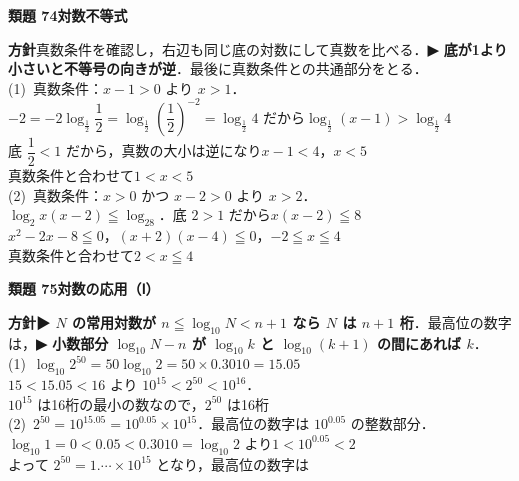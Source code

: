 \documentclass[a4paper,11pt]{ltjsarticle}
\newcommand{\ans}[2]{\Needspace{5\baselineskip}\vspace{6pt}%
  {\sffamily\bfseries 類題 #1\quad #2}\par}
\newcommand{\point}[1]{\textsf{\bfseries ▶ #1}}
\begin{document}
\ans{74}{対数不等式}
\begin{kai}
\textbf{方針}\quad 真数条件を確認し，右辺も同じ底の対数にして真数を比べる．\point{底が1より小さいと不等号の向きが逆}．最後に真数条件との共通部分をとる．\\[2pt]
(1)\ 真数条件：$x-1>0$ より $x>1$．\\
\hspace*{1.5em}$-2=-2\log_{\frac12}\dfrac12=\log_{\frac12}\left(\dfrac12\right)^{-2}=\log_{\frac12}4$ だから\quad $\log_{\frac12}(x-1)>\log_{\frac12}4$\\
\hspace*{1.5em}底 $\dfrac12<1$ だから，真数の大小は逆になり\quad $x-1<4$，\quad $x<5$\\
\hspace*{1.5em}真数条件と合わせて\quad $1<x<5$\\[2pt]
(2)\ 真数条件：$x>0$ かつ $x-2>0$ より $x>2$．\\
\hspace*{1.5em}$\log_2x(x-2)\leqq\log_28$．底 $2>1$ だから\quad $x(x-2)\leqq8$\\
\hspace*{1.5em}$x^2-2x-8\leqq0$，\quad $(x+2)(x-4)\leqq0$，\quad $-2\leqq x\leqq4$\\
\hspace*{1.5em}真数条件と合わせて\quad $2<x\leqq4$
\end{kai}

\ans{75}{対数の応用（Ⅰ）}
\begin{kai}
\textbf{方針}\quad \point{$N$ の常用対数が $n\leqq\log_{10}N<n+1$ なら $N$ は $n+1$ 桁}．最高位の数字は，\point{小数部分 $\log_{10}N-n$ が $\log_{10}k$ と $\log_{10}(k+1)$ の間にあれば $k$}．\\[2pt]
(1)\ $\log_{10}2^{50}=50\log_{10}2=50\times0.3010=15.05$\\
\hspace*{1.5em}$15<15.05<16$ より $10^{15}<2^{50}<10^{16}$．\\
\hspace*{1.5em}$10^{15}$ は16桁の最小の数なので，$2^{50}$ は\quad 16桁\\[2pt]
(2)\ $2^{50}=10^{15.05}=10^{0.05}\times10^{15}$．最高位の数字は $10^{0.05}$ の整数部分．\\
\hspace*{1.5em}$\log_{10}1=0<0.05<0.3010=\log_{10}2$ より\quad $1<10^{0.05}<2$\\
\hspace*{1.5em}よって $2^{50}=1.\cdots\times10^{15}$ となり，最高位の数字は
\end{kai}
\end{document}
